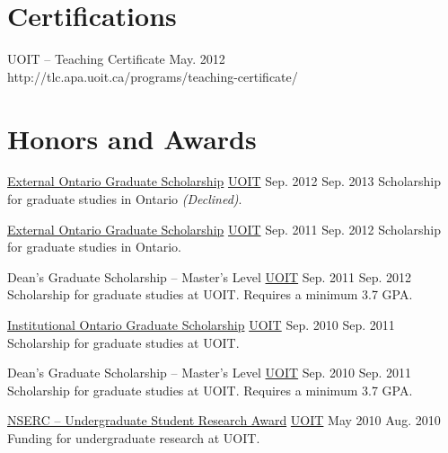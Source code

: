   \section{Certifications}

  \certificationEntry
    {UOIT -- Teaching Certificate }
    {May. 2012}
    {}
    {http://tlc.apa.uoit.ca/programs/teaching-certificate/}

  \section{Honors and Awards}{}

  \academicAwardsEntry
    {\href{https://osap.gov.on.ca/OSAPPortal/en/A-ZListofAid/TCONT003465.html}{External Ontario Graduate Scholarship}}
    {\href{http://uoit.ca/}{UOIT}}
    {Sep. 2012}
    {Sep. 2013}
    {Scholarship for graduate studies in Ontario \textit{(Declined)}.}

  \academicAwardsEntry
    {\href{https://osap.gov.on.ca/OSAPPortal/en/A-ZListofAid/TCONT003465.html}{External Ontario
Graduate Scholarship}}
    {\href{http://uoit.ca/}{UOIT}}
    {Sep. 2011}
    {Sep. 2012}
    {Scholarship for graduate studies in Ontario.}

  \academicAwardsEntry
    {Dean's Graduate Scholarship -- Master's Level}
    {\href{http://uoit.ca/}{UOIT}}
    {Sep. 2011}
    {Sep. 2012}
    {Scholarship for graduate studies at UOIT. Requires a minimum 3.7 GPA.}

  \academicAwardsEntry
    {\href{http://gradstudies.uoit.ca/test/EN/main/future\_students/awards\_and\_funding/external\_awards/OGSInstitutional.html}{Institutional Ontario
Graduate Scholarship}}
    {\href{http://uoit.ca/}{UOIT}}
    {Sep. 2010}
    {Sep. 2011}
    {Scholarship for graduate studies at UOIT.}

  \academicAwardsEntry
    {Dean's Graduate Scholarship -- Master's Level}
    {\href{http://uoit.ca/}{UOIT}}
    {Sep. 2010}
    {Sep. 2011}
    {Scholarship for graduate studies at UOIT. Requires a minimum 3.7 GPA.}

  \academicAwardsEntry
    {\href{http://www.nserc-crsng.gc.ca/students-etudiants/ug-pc/usra-brpc_eng.asp}{NSERC -- Undergraduate Student Research Award}}
    {\href{http://uoit.ca/}{UOIT}}
    {May 2010}
    {Aug. 2010}
    {Funding for undergraduate research at UOIT.}

